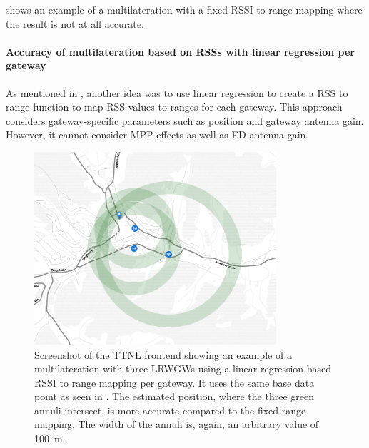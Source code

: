  shows an example of a multilateration with a fixed \ac{RSSI} to range mapping where the result is not at all accurate.

\paragraph{Accuracy of multilateration based on \aclp{RSS} with linear regression per gateway}\label{subsubsec:conclusion-rssi-linear-regression}

As mentioned in , another idea was to use linear regression to create a \ac{RSS} to range function to map \ac{RSS} values to ranges for each gateway.
This approach considers gateway-specific parameters such as position and gateway antenna gain.
However, it cannot consider \ac{MPP} effects as well as \acl{ED} antenna gain.

\begin{figure}[htbp]
    \centering
    \includegraphics[width=0.8\textwidth]{pictures/ttn-locator/frontend/multilateration/rssi_range_multilateration_regression_example.png}
    \caption[Screenshot of the \acl{TTNL} frontend showing an example of a multilateration using a linear regression based \acl{RSSI} to range mapping]{
        Screenshot of the \ac{TTNL} frontend showing an example of a multilateration with three \aclp{LRWGW} using a linear regression based \ac{RSSI} to range mapping per gateway.
        It uses the same base data point as seen in .
        The estimated position, where the three green annuli intersect, is more accurate compared to the fixed range mapping.
        The width of the annuli is, again, an arbitrary value of \SI{100}{\meter}.
    }\label{pic:rssi-to-range-multilateration-example-with-linear-regression}
\end{figure}


